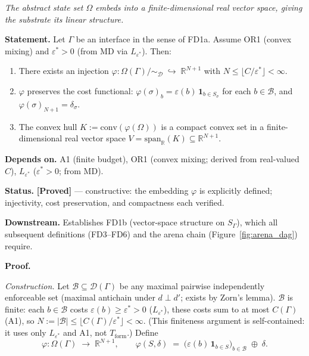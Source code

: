 \documentclass[11pt]{article}
\theoremstyle{remark}
\begin{document}
\begin{tcolorbox}[apfbox, title={Theorem $T_{\mathrm{embed}}$ (Canonical Embedding): FD1a $\to$ FD1b}]
\label{thm:T_embed}
\textit{The abstract state set $\Omega$ embeds into a finite-dimensional real vector space, giving the substrate its linear structure.}

\smallskip\noindent\textbf{Statement.}  Let $\Gamma$ be an interface in the sense of FD1a.  Assume OR1 (convex mixing) and $\varepsilon^* > 0$ (from MD via $L_{\varepsilon^*}$).  Then:
\begin{enumerate}[nosep,leftmargin=2em,itemsep=2pt,label=(\alph*)]
\item There exists an injection $\varphi: \Omega(\Gamma)/{\sim_\mathcal{D}} \;\hookrightarrow\; \mathbb{R}^{N+1}$ with $N \leq \lfloor C/\varepsilon^* \rfloor < \infty$.
\item $\varphi$ preserves the cost functional: $\varphi(\sigma)_b = \varepsilon(b)\,\mathbf{1}_{b \in S_\sigma}$ for each $b \in \mathcal{B}$, and $\varphi(\sigma)_{N+1} = \delta_\sigma$.
\item The convex hull $K := \mathrm{conv}(\varphi(\Omega))$ is a compact convex set in a finite-dimensional real vector space $V = \mathrm{span}_\mathbb{R}(K) \subseteq \mathbb{R}^{N+1}$.
\end{enumerate}

\smallskip\noindent\textbf{Depends on.}  A1 (finite budget), OR1 (convex mixing; derived from real-valued $C$), $L_{\varepsilon^*}$ ($\varepsilon^* > 0$; from MD).

\smallskip\noindent\textbf{Status.}  \textbf{[Proved]} --- constructive: the embedding $\varphi$ is explicitly defined; injectivity, cost preservation, and compactness each verified.

\smallskip\noindent\textbf{Downstream.}  Establishes FD1b (vector-space structure on $S_\Gamma$), which all subsequent definitions (FD3--FD6) and the arena chain (Figure~\ref{fig:arena_dag}) require.

\smallskip\noindent\textbf{Proof.}

\textit{Construction.}  Let $\mathcal{B} \subseteq \mathcal{D}(\Gamma)$ be any maximal pairwise independently enforceable set (maximal antichain under $d \perp d'$; exists by Zorn's lemma).  $\mathcal{B}$ is finite: each $b \in \mathcal{B}$ costs $\varepsilon(b) \ge \varepsilon^* > 0$ ($L_{\varepsilon^*}$), these costs sum to at most $C(\Gamma)$ (A1), so $N := |\mathcal{B}| \leq \lfloor C(\Gamma)/\varepsilon^* \rfloor < \infty$.  (This finiteness argument is self-contained: it uses only $L_{\varepsilon^*}$ and A1, not $T_{\mathrm{form}}$.)  Define
\[
\varphi: \Omega(\Gamma) \;\longrightarrow\; \mathbb{R}^{N+1}, \qquad \varphi(S,\delta) \;=\; \bigl(\varepsilon(b)\,\mathbf{1}_{b \in S}\bigr)_{b \in \mathcal{B}} \;\oplus\; \delta.
\]


\end{tcolorbox}
\end{document}
